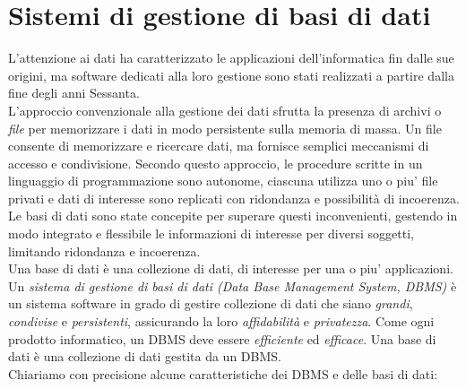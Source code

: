 \documentclass[12pt]{report}
\begin{document}
		\chapter{Sistemi di gestione di basi di dati}
			L'attenzione ai dati ha caratterizzato le applicazioni dell'informatica fin dalle sue origini, ma software dedicati alla loro gestione sono stati realizzati a partire dalla fine degli anni Sessanta. \\
			L'approccio convenzionale alla gestione dei dati sfrutta la presenza di archivi o \textit{file} per memorizzare i dati in modo persistente sulla memoria di massa. Un file consente di memorizzare e ricercare dati, ma fornisce semplici meccanismi di accesso e condivisione. Secondo questo approccio, le procedure scritte in un linguaggio di programmazione sono autonome, ciascuna utilizza uno o piu' file privati e dati di interesse sono replicati con ridondanza e possibilità di incoerenza. \\
			Le basi di dati sono state concepite per superare questi inconvenienti, gestendo in modo integrato e flessibile le informazioni di interesse per diversi soggetti, limitando ridondanza e incoerenza.  \\
			Una base di dati è una collezione di dati, di interesse per una o piu' applicazioni. \\
			Un \textit{sistema di gestione di basi di dati (Data Base Management System, DBMS)} è un sistema software in grado di gestire collezione di dati che siano \textit{grandi}, \textit{condivise} e \textit{persistenti}, assicurando la loro \textit{affidabilità} e \textit{privatezza}. Come ogni prodotto informatico, un DBMS deve essere \textit{efficiente} ed \textit{efficace}. Una base di dati è una collezione di dati gestita da un DBMS. \\
			Chiariamo con precisione alcune caratteristiche dei DBMS e delle basi di dati:
\end{document}
